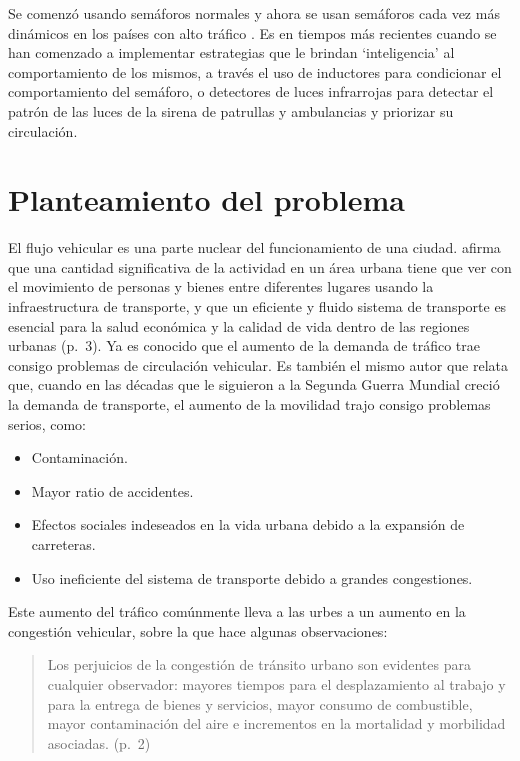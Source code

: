 Se comenzó usando semáforos normales y ahora se usan semáforos cada vez
más dinámicos en los países con alto tráfico . Es en tiempos más
recientes cuando se han comenzado a implementar estrategias que le
brindan `inteligencia' al comportamiento de los mismos, a través el uso
de inductores para condicionar el comportamiento del semáforo, o
detectores de luces infrarrojas para detectar el patrón de las luces de
la sirena de patrullas y ambulancias y priorizar su circulación.

\hypertarget{planteamiento-del-problema}{%
\section{Planteamiento del problema}\label{planteamiento-del-problema}}

El flujo vehicular es una parte nuclear del funcionamiento de una
ciudad. \textcite{Patriksson2012} afirma que una cantidad significativa
de la actividad en un área urbana tiene que ver con el movimiento de
personas y bienes entre diferentes lugares usando la infraestructura de
transporte, y que un eficiente y fluido sistema de transporte es
esencial para la salud económica y la calidad de vida dentro de las
regiones urbanas (p.~3). Ya es conocido que el aumento de la demanda de
tráfico trae consigo problemas de circulación vehicular. Es también el
mismo autor que relata que, cuando en las décadas que le siguieron a la
Segunda Guerra Mundial creció la demanda de transporte, el aumento de la
movilidad trajo consigo problemas serios, como:

\begin{itemize}
\item
  Contaminación.
\item
  Mayor ratio de accidentes.
\item
  Efectos sociales indeseados en la vida urbana debido a la expansión de
  carreteras.
\item
  Uso ineficiente del sistema de transporte debido a grandes
  congestiones.
\end{itemize}

Este aumento del tráfico comúnmente lleva a las urbes a un aumento en la
congestión vehicular, sobre la que \textcite{Medina-Durango2011} hace
algunas observaciones:

\begin{quote}
Los perjuicios de la congestión de tránsito urbano son evidentes para
cualquier observador: mayores tiempos para el desplazamiento al trabajo
y para la entrega de bienes y servicios, mayor consumo de combustible,
mayor contaminación del aire e incrementos en la mortalidad y morbilidad
asociadas. (p.~2)
\end{quote}

